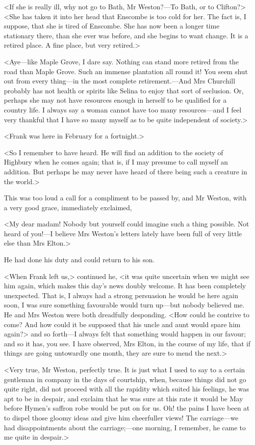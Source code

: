 <If she is really ill, why not go to Bath, Mr Weston?—To Bath, or to Clifton?> <She has taken it into her head that Enscombe is too cold for her. The fact is, I suppose, that she is tired of Enscombe. She has now been a longer time stationary there, than she ever was before, and she begins to want change. It is a retired place. A fine place, but very retired.>

<Aye—like Maple Grove, I dare say. Nothing can stand more retired from the road than Maple Grove. Such an immense plantation all round it! You seem shut out from every thing—in the most complete retirement.—And Mrs Churchill probably has not health or spirits like Selina to enjoy that sort of seclusion. Or, perhaps she may not have resources enough in herself to be qualified for a country life. I always say a woman cannot have too many resources—and I feel very thankful that I have so many myself as to be quite independent of society.>

<Frank was here in February for a fortnight.>

<So I remember to have heard. He will find an addition to the society of Highbury when he comes again; that is, if I may presume to call myself an addition. But perhaps he may never have heard of there being such a creature in the world.>

This was too loud a call for a compliment to be passed by, and Mr Weston, with a very good grace, immediately exclaimed,

<My dear madam! Nobody but yourself could imagine such a thing possible. Not heard of you!—I believe Mrs Weston's letters lately have been full of very little else than Mrs Elton.>

He had done his duty and could return to his son.

<When Frank left us,> continued he, <it was quite uncertain when we might see him again, which makes this day's news doubly welcome. It has been completely unexpected. That is, I always had a strong persuasion he would be here again soon, I was sure something favourable would turn up—but nobody believed me. He and Mrs Weston were both dreadfully desponding. <How could he contrive to come? And how could it be supposed that his uncle and aunt would spare him again?> and so forth—I always felt that something would happen in our favour; and so it has, you see. I have observed, Mrs Elton, in the course of my life, that if things are going untowardly one month, they are sure to mend the next.>

<Very true, Mr Weston, perfectly true. It is just what I used to say to a certain gentleman in company in the days of courtship, when, because things did not go quite right, did not proceed with all the rapidity which suited his feelings, he was apt to be in despair, and exclaim that he was sure at this rate it would be May before Hymen's saffron robe would be put on for us. Oh! the pains I have been at to dispel those gloomy ideas and give him cheerfuller views! The carriage—we had disappointments about the carriage;—one morning, I remember, he came to me quite in despair.>

